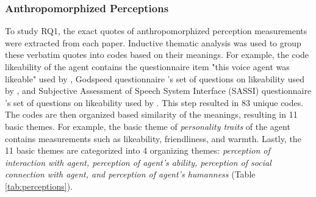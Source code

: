 \documentclass[sigconf,screen,review, anonymous]{acmart}
\newcommand{\cmt}[1]{}%
\begin{document}
\subsubsection*{Anthropomorphized Perceptions} To study RQ1, the exact quotes of anthropomorphized perception measurements were extracted from each paper. Inductive thematic analysis was used to group these verbatim quotes into codes based on their meanings. For example, the code likeability of the agent contains the questionnaire item "this voice agent was likeable" used by \cite{cuadra2021my}\cmt{[67]}, Godspeed questionnaire \cite{bartneck2009measurement}\cmt{godspeed}'s set of questions on likeability used by \cite{linnemann2018can}\cmt{[15]}, and Subjective Assessment of Speech System Interface (SASSI) questionnaire \cite{hone2000towards}\cmt{sassi}'s set of questions on likeability used by  \cite{chan2021kinvoices}\cmt{[74]}\cite{choi2020nobody}\cmt{[54]}. This step resulted in 83 unique codes. The codes are then organized based similarity of the meanings, resulting in 11 basic themes. For example, the basic theme of \textit{personality traits} of the agent contains measurements such as likeability, friendliness, and warmth. Lastly, the 11 basic themes are categorized into 4 organizing themes: \textit{perception of interaction with agent, perception of agent's ability, perception of social connection with agent, and perception of agent's humanness} (Table \ref{tab:perceptions}).
\end{document}
